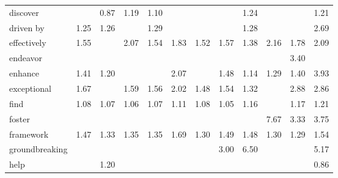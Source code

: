 \begin{tabular}{|l|c|c|c|c|c|c|c|c|c|c|c|}
discover &  & \cellcolor{yellow!17} 0.87 & \cellcolor{yellow!23} 1.19 & \cellcolor{yellow!22} 1.10 &  &  &  & \cellcolor{yellow!24} 1.24 &  &  & \cellcolor{yellow!24} 1.21 \\
driven by & \cellcolor{yellow!25} 1.25 & \cellcolor{yellow!25} 1.26 &  & \cellcolor{yellow!25} 1.29 &  &  &  & \cellcolor{yellow!25} 1.28 &  &  & \cellcolor{yellow!53} 2.69 \\
effectively & \cellcolor{yellow!31} 1.55 &  & \cellcolor{yellow!41} 2.07 & \cellcolor{yellow!30} 1.54 & \cellcolor{yellow!36} 1.83 & \cellcolor{yellow!30} 1.52 & \cellcolor{yellow!31} 1.57 & \cellcolor{yellow!27} 1.38 & \cellcolor{yellow!43} 2.16 & \cellcolor{yellow!35} 1.78 & \cellcolor{yellow!41} 2.09 \\
endeavor &  &  &  &  &  &  &  &  &  & \cellcolor{yellow!68} 3.40 &  \\
enhance & \cellcolor{yellow!28} 1.41 & \cellcolor{yellow!24} 1.20 &  &  & \cellcolor{yellow!41} 2.07 &  & \cellcolor{yellow!29} 1.48 & \cellcolor{yellow!22} 1.14 & \cellcolor{yellow!25} 1.29 & \cellcolor{yellow!27} 1.40 & \cellcolor{yellow!78} 3.93 \\
exceptional & \cellcolor{yellow!33} 1.67 &  & \cellcolor{yellow!31} 1.59 & \cellcolor{yellow!31} 1.56 & \cellcolor{yellow!40} 2.02 & \cellcolor{yellow!29} 1.48 & \cellcolor{yellow!30} 1.54 & \cellcolor{yellow!26} 1.32 &  & \cellcolor{yellow!57} 2.88 & \cellcolor{yellow!57} 2.86 \\
find & \cellcolor{yellow!21} 1.08 & \cellcolor{yellow!21} 1.07 & \cellcolor{yellow!21} 1.06 & \cellcolor{yellow!21} 1.07 & \cellcolor{yellow!22} 1.11 & \cellcolor{yellow!21} 1.08 & \cellcolor{yellow!21} 1.05 & \cellcolor{yellow!23} 1.16 &  & \cellcolor{yellow!23} 1.17 & \cellcolor{yellow!24} 1.21 \\
foster &  &  &  &  &  &  &  &  & \cellcolor{yellow!100} 7.67 & \cellcolor{yellow!66} 3.33 & \cellcolor{yellow!75} 3.75 \\
framework & \cellcolor{yellow!29} 1.47 & \cellcolor{yellow!26} 1.33 & \cellcolor{yellow!27} 1.35 & \cellcolor{yellow!27} 1.35 & \cellcolor{yellow!33} 1.69 & \cellcolor{yellow!26} 1.30 & \cellcolor{yellow!29} 1.49 & \cellcolor{yellow!29} 1.48 & \cellcolor{yellow!26} 1.30 & \cellcolor{yellow!25} 1.29 & \cellcolor{yellow!30} 1.54 \\
groundbreaking &  &  &  &  &  &  & \cellcolor{yellow!60} 3.00 & \cellcolor{yellow!100} 6.50 &  &  & \cellcolor{yellow!100} 5.17 \\
help &  & \cellcolor{yellow!24} 1.20 &  &  &  &  &  &  &  &  & \cellcolor{yellow!17} 0.86 \\

\end{tabular}
